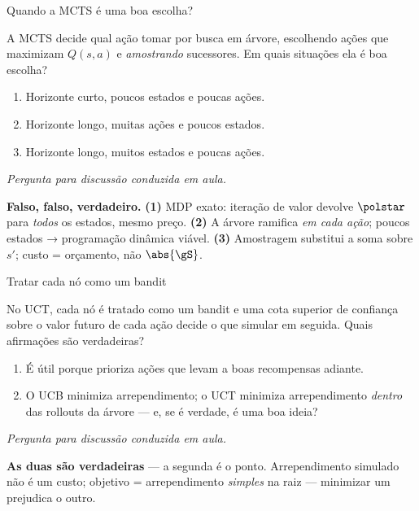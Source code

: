 \documentclass[aspectratio=169, 10pt]{beamer}
\newcommand{\paradiscussao}{\smallskip
  {\footnotesize\color{rlCinza}\itshape Pergunta para discussão conduzida em aula.}}
\begin{document}
\begin{frame}{Quando a MCTS é uma boa escolha?}
  \footnotesize
  \begin{quizbox}{}
    A MCTS decide qual ação tomar por busca em árvore, escolhendo ações que
    maximizam $Q(s,a)$ e \emph{amostrando} sucessores. Em quais situações ela é
    boa escolha?
    \smallskip
    \begin{enumerate}\setlength{\itemsep}{0em}
      \item Horizonte curto, poucos estados e poucas ações.
      \item Horizonte longo, \alert{muitas ações} e poucos estados.
      \item Horizonte longo, \alert{muitos estados} e poucas ações.
    \end{enumerate}
    \paradiscussao
  \end{quizbox}

  \pause
  \vspace{-0.35em}
  \begin{respbox}
    \textbf{Falso, falso, verdadeiro.}
    \textbf{(1)} MDP exato: iteração de valor devolve $\polstar$ para
    \emph{todos} os estados, mesmo preço.
    \textbf{(2)} A árvore ramifica \emph{em cada ação}; poucos estados →
    programação dinâmica viável.
    \textbf{(3)} Amostragem substitui a soma sobre $s'$; custo = orçamento,
    não $\abs{\gS}$.
  \end{respbox}
\end{frame}

\begin{frame}{Tratar cada nó como um bandit}
  \footnotesize
  \begin{quizbox}{}
    No UCT, cada nó é tratado como um bandit e uma cota superior de confiança
    sobre o valor futuro de cada ação decide o que simular em seguida. Quais
    afirmações são verdadeiras?
    \smallskip
    \begin{enumerate}\setlength{\itemsep}{0em}
      \item É útil porque prioriza ações que levam a boas recompensas adiante.
      \item O UCB minimiza arrependimento; o UCT minimiza arrependimento
            \emph{dentro} das rollouts da árvore --- e, se é verdade, é uma boa
            ideia?
    \end{enumerate}
    \paradiscussao
  \end{quizbox}

  \pause
  \begin{respbox}
    \textbf{As duas são verdadeiras} — a segunda é o ponto. Arrependimento
    simulado \alert{não é um custo}; objetivo = arrependimento \emph{simples} na
    raiz — minimizar um prejudica o outro.
  \end{respbox}
\end{frame}
\end{document}
